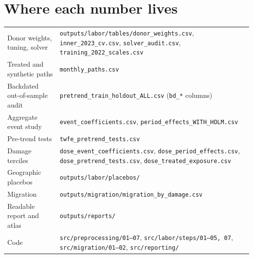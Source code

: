 \documentclass[11pt,a4paper]{article}
\begin{document}
\section{Where each number lives}
\begin{center}\small
\begin{tabular}{>{\raggedright}p{5.6cm}>{\raggedright\arraybackslash}p{9.2cm}}
\toprule
Donor weights, tuning, solver & \texttt{outputs/labor/tables/donor\_weights.csv}, \texttt{inner\_2023\_cv.csv}, \texttt{solver\_audit.csv}, \texttt{training\_2022\_scales.csv}\\
Treated and synthetic paths & \texttt{monthly\_paths.csv}\\
Backdated out-of-sample audit & \texttt{pretrend\_train\_holdout\_ALL.csv} (\texttt{bd\_*} columns)\\
Aggregate event study & \texttt{event\_coefficients.csv}, \texttt{period\_effects\_WITH\_HOLM.csv}\\
Pre-trend tests & \texttt{twfe\_pretrend\_tests.csv}\\
Damage terciles & \texttt{dose\_event\_coefficients.csv}, \texttt{dose\_period\_effects.csv}, \texttt{dose\_pretrend\_tests.csv}, \texttt{dose\_treated\_exposure.csv}\\
Geographic placebos & \texttt{outputs/labor/placebos/}\\
Migration & \texttt{outputs/migration/migration\_by\_damage.csv}\\
Readable report and atlas & \texttt{outputs/reports/}\\
Code & \texttt{src/preprocessing/01--07}, \texttt{src/labor/steps/01--05, 07}, \texttt{src/migration/01--02}, \texttt{src/reporting/}\\
\bottomrule
\end{tabular}
\end{center}
\end{document}
